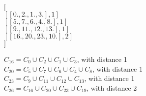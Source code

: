 \begin{minipage}{0.4\textwidth}
$[$\\
    $[[ 0.,  2.,  1.,  3.], 1]$\\
    $[[ 5.,  7.,  6.,  4.,  8.], 1]$\\
    $[[ 9., 11.,  12.,  13. ], 1]$\\
    $[[16.,  20.,  23.,  10.], 2]$  \\        
$]$\\
\end{minipage}  \hfill
\begin{minipage}{0.4\textwidth}
$C_{16} = C_0 \cup C_2 \cup C_1 \cup C_3$, with distance 1 \\  
$C_{20} = C_5 \cup C_7 \cup C_6 \cup C_4 \cup C_8$, with distance 1 \\ 
$C_{23} = C_9 \cup C_{11} \cup C_{12} \cup C_{13}$, with distance 1 \\ 
$C_{26} = C_{16} \cup C_{20} \cup C_{23} \cup C_{19}$, with distance 2 \\         
\end{minipage} 






